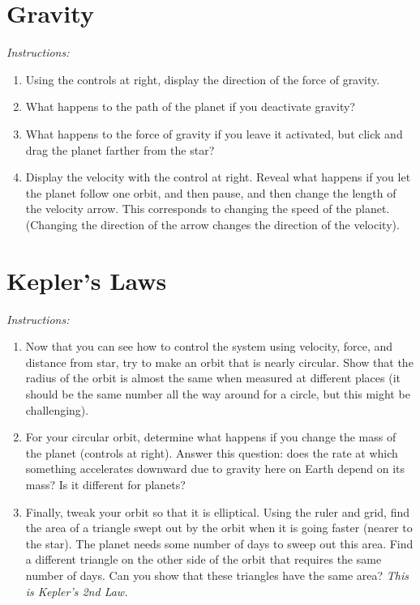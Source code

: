 \documentclass[10pt]{article}
\begin{document}
\section{Gravity}

\textit{Instructions:}
\begin{enumerate}
\item Using the controls at right, display the direction of the force of gravity.
\item What happens to the path of the planet if you deactivate gravity?
\item What happens to the force of gravity if you leave it activated, but click and drag the planet farther from the star?
\item Display the velocity with the control at right.  Reveal what happens if you let the planet follow one orbit, and then pause, and then change the length of the velocity arrow.  This corresponds to changing the speed of the planet.  (Changing the direction of the arrow changes the direction of the velocity).
\end{enumerate}
\vspace{1.5cm}

\section{Kepler's Laws}

\textit{Instructions:}
\begin{enumerate}
\item Now that you can see how to control the system using velocity, force, and distance from star, try to make an orbit that is nearly circular.  Show that the radius of the orbit is almost the same when measured at different places (it should be the same number all the way around for a circle, but this might be challenging).
\item For your circular orbit, determine what happens if you change the mass of the planet (controls at right).  Answer this question: does the rate at which something accelerates downward due to gravity here on Earth depend on its mass?  Is it different for planets?
\item Finally, tweak your orbit so that it is elliptical.  Using the ruler and grid, find the area of a triangle swept out by the orbit when it is going faster (nearer to the star).  The planet needs some number of days to sweep out this area.  Find a different triangle on the other side of the orbit that requires the same number of days.  Can you show that these triangles have the same area?  \textit{This is Kepler's 2nd Law.}
\end{enumerate}
\end{document}
